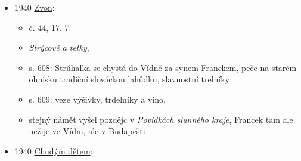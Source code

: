 \begin{itemize}
  \begin{itemize}
  \tightlist
  \item
    Lidové noviny. Brno: Vydavatelské družstvo Lidové strany v Brně,
    27.10.1940, 48(547***, ranní vydání), s. 4. ISSN 1802-6265.
  \item
    \emph{Dobrá domácnost: zdraví a svéráz v naší stravě},
  \item
    článek o rožnění, cituje nevydané paměti Josefa Úlehly
  \item
    oheň býval na ohništi otevřený, nezakrytý, ohniště bylo pod komínem.
    Nad řezavé uhlí se stavěly rendlíky, na kterých se pražilo maso nebo
    zelenina.
  \item
    také se nad uhlíky přistavoval rožeň, na ten se nabodávalo maso,
    kuře, slepice, sele, rožněm se otáčelo a maso pomašťovalo
  \item
    na rožni býval jako na ose dřevěný válec, na ten se namotávalo těsto
    a peklo nad řezavým uhlím, ten válec se jmenoval trdlo
  \item
    na trdle se pekly trdelníky, těsto bylo jemné, mastně, z něho se
    vytahovaly tenké praménky namotávaly těsně kolem trdla
  \item
    trdlem se neustále otáčelo a trdelník se potíral pilně žloutkem
    vaječným. Upečený trdelník se posypával cukrem s rozemletým ořechem
    vlašským.
  \item
    při trdleníku poznáte, kdo je Slovák a kdo není. Slovák trdelníku
    odvinuje jemně pramének k praménku, kdo není Slovák, často trdelník
    rozkrajuje nožem a nabodává na vidličku.
  \end{itemize}
\item
  1940
  \href{https://www.digitalniknihovna.cz/mzk/uuid/uuid:fc235b10-e2cf-11e3-bbd5-5ef3fc9bb22f}{Zvon}:

  \begin{itemize}
  \tightlist
  \item
    č. 44, 17. 7.
  \item
    \emph{Strýcové a tetky}, 
  \item
    s. 608: Strúhalka se chystá do Vídně za synem Franckem, peče na
    starém ohnisku tradiční slováckou lahůdku, slavnostní trelníky
  \item
    s. 609: veze výšivky, trdelníky a víno.
  \item
    stejný námět vyšel pozdějc v \emph{Povídkách slunného kraje},
    Francek tam ale nežije ve Vídni, ale v Budapešti
  \end{itemize}
\item
  1940
  \href{https://www.digitalniknihovna.cz/mzk/uuid/uuid:70cc2001-84bc-11e2-bdc3-5ef3fc9bb22f}{Chudým
  dětem}:


\end{itemize}
